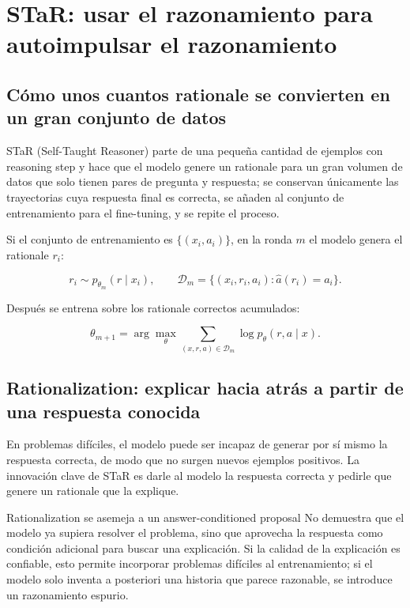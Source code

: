 \section{STaR: usar el razonamiento para autoimpulsar el razonamiento}

\subsection{Cómo unos cuantos rationale se convierten en un gran conjunto de datos}

STaR (Self-Taught Reasoner) parte de una pequeña cantidad de ejemplos con reasoning step y hace que el modelo genere un rationale para un gran volumen de datos que solo tienen pares de pregunta y respuesta; se conservan únicamente las trayectorias cuya respuesta final es correcta, se añaden al conjunto de entrenamiento para el fine-tuning, y se repite el proceso.


Si el conjunto de entrenamiento es $\{(x_i,a_i)\}$, en la ronda $m$ el modelo genera el rationale $r_i$:

$$
r_i\sim p_{\theta_m}(r\mid x_i),\qquad
\mathcal D_m=\{(x_i,r_i,a_i):\hat a(r_i)=a_i\}.
$$

Después se entrena sobre los rationale correctos acumulados:

$$
\theta_{m+1}=\arg\max_\theta
\sum_{(x,r,a)\in\mathcal D_m}\log p_\theta(r,a\mid x).
$$

\subsection{Rationalization: explicar hacia atrás a partir de una respuesta conocida}

En problemas difíciles, el modelo puede ser incapaz de generar por sí mismo la respuesta correcta, de modo que no surgen nuevos ejemplos positivos. La innovación clave de STaR es darle al modelo la respuesta correcta y pedirle que genere un rationale que la explique.


\begin{knowledgebox}{Rationalization se asemeja a un answer-conditioned proposal}
No demuestra que el modelo ya supiera resolver el problema, sino que aprovecha la respuesta como condición adicional para buscar una explicación. Si la calidad de la explicación es confiable, esto permite incorporar problemas difíciles al entrenamiento; si el modelo solo inventa a posteriori una historia que parece razonable, se introduce un razonamiento espurio.
\end{knowledgebox}

